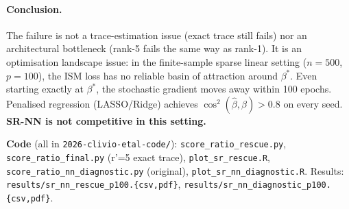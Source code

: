 \documentclass[11pt]{article}
\begin{document}
\paragraph{Conclusion.}
The failure is not a trace-estimation issue (exact trace still fails) nor an
architectural bottleneck (rank-5 fails the same way as rank-1).  It is an
optimisation landscape issue: in the finite-sample sparse linear setting
($n=500$, $p=100$), the ISM loss has no reliable basin of attraction around
$\beta^*$.  Even starting exactly at $\beta^*$, the stochastic gradient moves
away within 100 epochs.  Penalised regression (LASSO/Ridge) achieves
$\cos^2(\hat\beta,\beta)>0.8$ on every seed.  \textbf{SR-NN is not competitive
in this setting.}

\bigskip\noindent
\textbf{Code} (all in \texttt{2026-clivio-etal-code/}):
\texttt{score\_ratio\_rescue.py},
\texttt{score\_ratio\_final.py} (r'=5 exact trace),
\texttt{plot\_sr\_rescue.R},
\texttt{score\_ratio\_nn\_diagnostic.py} (original),
\texttt{plot\_sr\_nn\_diagnostic.R}.
Results: \texttt{results/sr\_nn\_rescue\_p100.\{csv,pdf\}},
\texttt{results/sr\_nn\_diagnostic\_p100.\{csv,pdf\}}.
\end{document}
